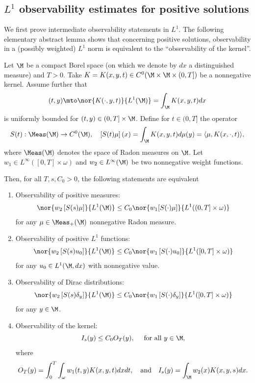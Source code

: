 \subsection{$L^1$ observability estimates for positive solutions}
\label{s:L1obs}
We first prove intermediate observability statements in $L^1$.
The following elementary abstract lemma shows that concerning positive solutions, observability in a (possibly weighted) $L^1$ norm is equivalent to the ``observability of the kernel''.
\begin{proposition}
\label{propequivobsKernel}
Let $\M$ be a compact Borel space (on which we denote by $dx$ a distinguished measure) and $T>0$. Take $K =K(x,y,t) \in C^0( \M \times \M\times(0,T] )$ be a nonnegative kernel. Assume further that
\[
(t,y) \mto \nor{K(\cdot,y,t)}{L^1(\M)} = \int_\M K(x,y,t) dx
\]
is uniformly bounded for $(t,y)\in (0,T] \times \M$.
Define for $t\in (0,T]$ the operator
\[
S(t) : \Meas(\M) \to C^0(\M), \quad
\left[S(t)\mu \right](x)=\int_{\M} K(x,y,t)d\mu(y) = \langle \mu, K(x,\cdot,t) \rangle,
\]
where $\Meas(\M)$ denotes the space of Radon measures on $\M$.
Let $w_1\in L^{\infty}([0,T]\times \omega)$ and $w_2\in L^{\infty}(\M)$ be two nonnegative weight functions.

Then, for all $T, s,C_0>0$, the following statements are equivalent
\begin{enumerate}
\item \label{enumObsmeasure}Observability of positive measures:
\begin{equation}
\label{e:meas-mu-obs}
\nor{w_2 \left[S(s)\mu\right]}{L^1(\M)}\leq C_0 \nor{w_1 [S(\cdot)\mu]}{L^1((0,T]\times\omega)}
\end{equation}
for any $\mu \in \Meas_+(\M)$ nonnegative Radon measure.
\item \label{enumObsL1} Observability of positive $L^1$ functions:
\[
\nor{w_2 \left[S(s)u_0\right]}{L^1(\M)}\leq C_0 \nor{w_1\left[S(\cdot)u_0\right]}{L^1([0,T]\times \omega)}
\]
for any $u_0\in L^1(\M, dx)$ with nonnegative value.
\item \label{enumObsDirac}Observability of Dirac distributions:
\[
\nor{w_2 \left[S(s) \delta_y \right]}{L^1(\M)}\leq C_0 \nor{w_1 \left[S(\cdot) \delta_y \right]}{L^1([0,T]\times \omega)}
\]
for any $y\in \M$.
\item \label{enumObsKernel}Observability of the kernel:
\[
I_s (y)\leq C_0 O_T(y), \quad \text{ for all } y \in \M,
\]
where
\[
O_T(y)=\int_0^T \int_{\omega} w_1(t,y)K(x,y,t)dx dt, \quad \text{and} \quad
I_s (y)=\int_{\M} w_2(x)K(x,y,s)dx.
\]
\end{enumerate}
\end{proposition}
